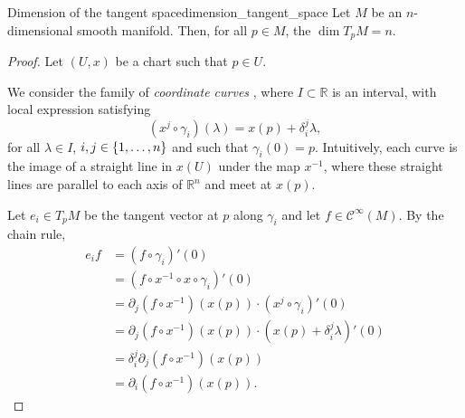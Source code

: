 \begin{theorem}{Dimension of the tangent space}{dimension_tangent_space}
    Let \(M\) be an \(n\)-dimensional smooth manifold. Then, for all \(p \in M\), the \(\dim T_pM = n\).
\end{theorem}
\begin{proof}
    Let \((U, x)\) be a chart such that \(p \in U\).%

    We consider the family of \emph{coordinate curves} , where \(I \subset \mathbb{R}\) is an interval, with local expression satisfying
    \begin{equation*}
        (x^j \circ \gamma_i)(\lambda) = x(p) + \delta_i^j \lambda,
    \end{equation*}
    for all \(\lambda \in I\), \(i, j \in \{1, \dots, n\}\) and such that \(\gamma_i(0) = p\).
    Intuitively, each curve is the image of a straight line in \(x(U)\) under the map \(x^{-1}\), where these straight lines are parallel to each axis of \(\mathbb{R}^n\) and meet at \(x(p)\).

    Let \(e_i \in T_pM\) be the tangent vector at \(p\) along \(\gamma_i\) and let \(f \in \mathcal{C}^\infty(M).\) By the chain rule,
    \begin{align*}
        e_i f &= (f\circ \gamma_i)'(0)\\
              &= (f \circ x^{-1} \circ x \circ \gamma_i)'(0)\\
              &= \partial_j (f \circ x^{-1})(x(p)) \cdot (x^j \circ \gamma_i)'(0)\\
              &= \partial_j (f \circ x^{-1})(x(p)) \cdot (x(p) + \delta_i^j \lambda)'(0)\\
              &= \delta_i^j \partial_j (f \circ x^{-1})(x(p))\\
              &= \partial_i (f \circ x^{-1})(x(p)).
    \end{align*}


\end{proof}

